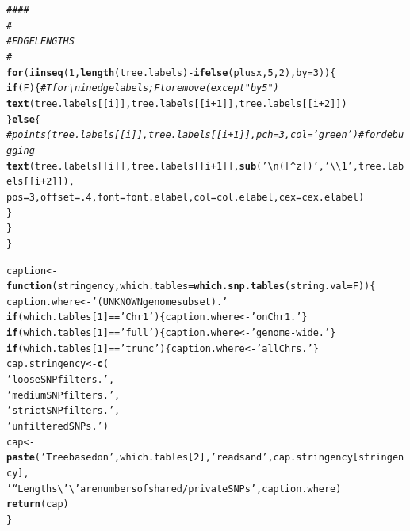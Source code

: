 \documentclass{article}\usepackage[]{graphicx}\usepackage[]{color}
\makeatletter
\newcommand{\hlnum}[1]{\textcolor[rgb]{0.686,0.059,0.569}{#1}}%
\newcommand{\hlstr}[1]{\textcolor[rgb]{0.192,0.494,0.8}{#1}}%
\newcommand{\hlcom}[1]{\textcolor[rgb]{0.678,0.584,0.686}{\textit{#1}}}%
\newcommand{\hlopt}[1]{\textcolor[rgb]{0,0,0}{#1}}%
\newcommand{\hlstd}[1]{\textcolor[rgb]{0.345,0.345,0.345}{#1}}%
\newcommand{\hlkwa}[1]{\textcolor[rgb]{0.161,0.373,0.58}{\textbf{#1}}}%
\newcommand{\hlkwb}[1]{\textcolor[rgb]{0.69,0.353,0.396}{#1}}%
\newcommand{\hlkwc}[1]{\textcolor[rgb]{0.333,0.667,0.333}{#1}}%
\newcommand{\hlkwd}[1]{\textcolor[rgb]{0.737,0.353,0.396}{\textbf{#1}}}%
\newenvironment{kframe}{%
 \def\at@end@of@kframe{}%
 \ifinner\ifhmode%
  \def\at@end@of@kframe{\end{minipage}}%
  \begin{minipage}{\columnwidth}%
 \fi\fi%
 \def\FrameCommand##1{\hskip\@totalleftmargin \hskip-\fboxsep
 \colorbox{shadecolor}{##1}\hskip-\fboxsep
     \hskip-\linewidth \hskip-\@totalleftmargin \hskip\columnwidth}%
 \MakeFramed {\advance\hsize-\width
   \@totalleftmargin\z@ \linewidth\hsize
   \@setminipage}}%
 {\par\unskip\endMakeFramed%
 \at@end@of@kframe}
\newenvironment{knitrout}{}{} %
\makeatother
\begin{document}
\begin{knitrout}
\begin{kframe}
\begin{alltt}
  \hlcom{####}
  \hlcom{#}
  \hlcom{# EDGE LENGTHS}
  \hlcom{#}
  \hlkwa{for}\hlstd{(i} \hlkwa{in} \hlkwd{seq}\hlstd{(}\hlnum{1}\hlstd{,}\hlkwd{length}\hlstd{(tree.labels)}\hlopt{-}\hlkwd{ifelse}\hlstd{(plusx,}\hlnum{5}\hlstd{,}\hlnum{2}\hlstd{),}\hlkwc{by}\hlstd{=}\hlnum{3}\hlstd{))\{}
    \hlkwa{if}\hlstd{(F)\{} \hlcom{# T for \textbackslash{}n in edge labels; F to remove (except "by 5")}
      \hlkwd{text}\hlstd{(tree.labels[[i]], tree.labels[[i}\hlopt{+}\hlnum{1}\hlstd{]], tree.labels[[i}\hlopt{+}\hlnum{2}\hlstd{]])}
    \hlstd{\}} \hlkwa{else} \hlstd{\{}
      \hlcom{# points(tree.labels[[i]], tree.labels[[i+1]], pch=3,col='green') # for debugging}
      \hlkwd{text}\hlstd{(tree.labels[[i]], tree.labels[[i}\hlopt{+}\hlnum{1}\hlstd{]],} \hlkwd{sub}\hlstd{(}\hlstr{'\textbackslash{}n([^z])'}\hlstd{,}\hlstr{' \textbackslash{}\textbackslash{}1'}\hlstd{, tree.labels[[i}\hlopt{+}\hlnum{2}\hlstd{]]),}
           \hlkwc{pos}\hlstd{=}\hlnum{3}\hlstd{,} \hlkwc{offset}\hlstd{=}\hlnum{.4}\hlstd{,} \hlkwc{font}\hlstd{=font.elabel,} \hlkwc{col}\hlstd{=col.elabel,}\hlkwc{cex}\hlstd{=cex.elabel)}
    \hlstd{\}}
  \hlstd{\}}
\hlstd{\}}

\hlstd{caption} \hlkwb{<-} \hlkwa{function}\hlstd{(}\hlkwc{stringency}\hlstd{,}\hlkwc{which.tables}\hlstd{=}\hlkwd{which.snp.tables}\hlstd{(}\hlkwc{string.val}\hlstd{=F))\{}
  \hlstd{caption.where} \hlkwb{<-} \hlstr{'(UNKNOWN genome subset).'}
  \hlkwa{if}\hlstd{(which.tables[}\hlnum{1}\hlstd{]}\hlopt{==}\hlstr{'Chr1'}\hlstd{) \{caption.where} \hlkwb{<-} \hlstr{'on Chr1.'}\hlstd{\}}
  \hlkwa{if}\hlstd{(which.tables[}\hlnum{1}\hlstd{]}\hlopt{==}\hlstr{'full'}\hlstd{) \{caption.where} \hlkwb{<-} \hlstr{'genome-wide.'}\hlstd{\}}
  \hlkwa{if}\hlstd{(which.tables[}\hlnum{1}\hlstd{]}\hlopt{==}\hlstr{'trunc'}\hlstd{)\{caption.where} \hlkwb{<-} \hlstr{'all Chrs.'}\hlstd{\}}
  \hlstd{cap.stringency} \hlkwb{<-} \hlkwd{c}\hlstd{(}
    \hlstr{'loose SNP filters.'}\hlstd{,}
    \hlstr{'medium SNP filters.'}\hlstd{,}
    \hlstr{'strict SNP filters.'}\hlstd{,}
    \hlstr{'unfiltered SNPs.'}\hlstd{)}
  \hlstd{cap} \hlkwb{<-} \hlkwd{paste}\hlstd{(}\hlstr{'Tree based on'}\hlstd{, which.tables[}\hlnum{2}\hlstd{],} \hlstr{'reads and'}\hlstd{, cap.stringency[stringency],}
               \hlstr{' ``Lengths\textbackslash{}'\textbackslash{}' are numbers of shared/private SNPs'}\hlstd{, caption.where)}
  \hlkwd{return}\hlstd{(cap)}
\hlstd{\}}
\end{alltt}
\end{kframe}
\end{knitrout}
\end{document}
